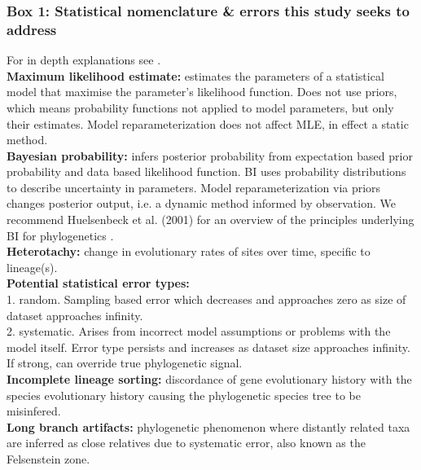 \documentclass[12pt]{article}
\begin{document}
\subsubsection*{Box 1: Statistical nomenclature \& errors this study seeks to address}
For in depth explanations see \cite{yang2014molecular}.\\
\textbf{Maximum likelihood estimate:} estimates the parameters of a statistical model that maximise the parameter's likelihood function. 
Does not use priors, which means probability functions not applied to model parameters, but only their estimates. 
Model reparameterization does not affect MLE, in effect a static method.\\
\textbf{Bayesian probability:} infers posterior probability from expectation based prior probability and data based likelihood function.
BI uses probability distributions to describe uncertainty in parameters.
Model reparameterization via priors changes posterior output, i.e. a dynamic method informed by observation. 
We recommend Huelsenbeck et al. (2001) for an overview of the principles underlying BI for phylogenetics \cite{huelsenbeck2001bayesian}.\\
\textbf{Heterotachy:} change in evolutionary rates of sites over time, specific to lineage(s).\\
\textbf{Potential statistical error types:}\\
1. random. Sampling based error which decreases and approaches zero as size of dataset approaches infinity.\\
2. systematic. Arises from incorrect model assumptions or problems with the model itself. 
Error type persists and increases as dataset size approaches infinity. 
If strong, can override true phylogenetic signal.\\
\textbf{Incomplete lineage sorting:} discordance of gene evolutionary history with the species evolutionary history causing the phylogenetic species tree to be misinfered.\\
\textbf{Long branch artifacts:} phylogenetic phenomenon where distantly related taxa are inferred as close relatives due to systematic error, also known as the Felsenstein zone.
\end{document}
